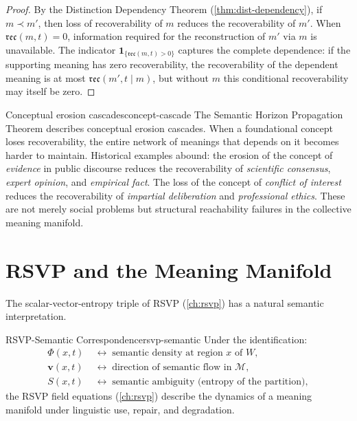 \documentclass[12pt,twoside,openright]{book}
\newcommand{\reco}{\mathfrak{rec}}
\begin{document}
\begin{proof}
  By the Distinction Dependency Theorem
  (\cref{thm:dist-dependency}), if $m \prec m'$,
  then loss of recoverability of $m$ reduces the
  recoverability of $m'$.
  When $\reco(m, t) = 0$, information required for
  the reconstruction of $m'$ via $m$ is unavailable.
  The indicator $\mathbf{1}_{\{\reco(m,t)>0\}}$
  captures the complete dependence: if the supporting
  meaning has zero recoverability, the recoverability
  of the dependent meaning is at most
  $\reco(m', t \mid m)$, but without $m$ this
  conditional recoverability may itself be zero.
\end{proof}

\begin{remark}{Conceptual erosion cascades}{concept-cascade}
  The Semantic Horizon Propagation Theorem describes
  conceptual erosion cascades.
  When a foundational concept loses recoverability,
  the entire network of meanings that depends on it
  becomes harder to maintain.
  Historical examples abound:
  the erosion of the concept of \emph{evidence}
  in public discourse reduces the recoverability of
  \emph{scientific consensus}, \emph{expert opinion},
  and \emph{empirical fact}.
  The loss of the concept of \emph{conflict of interest}
  reduces the recoverability of \emph{impartial
  deliberation} and \emph{professional ethics}.
  These are not merely social problems but structural
  reachability failures in the collective meaning manifold.
\end{remark}

\section{RSVP and the Meaning Manifold}

The scalar-vector-entropy triple of RSVP
(\cref{ch:rsvp}) has a natural semantic interpretation.

\begin{proposition}{RSVP-Semantic Correspondence}{rsvp-semantic}
  Under the identification:
  \begin{align*}
    \Phi(x,t) &\;\leftrightarrow\;
    \text{semantic density at region }x\text{ of }W, \\
    \mathbf{v}(x,t) &\;\leftrightarrow\;
    \text{direction of semantic flow in }\mathcal{M}, \\
    S(x,t) &\;\leftrightarrow\;
    \text{semantic ambiguity (entropy of the partition)},
  \end{align*}
  the RSVP field equations (\cref{ch:rsvp}) describe
  the dynamics of a meaning manifold under linguistic
  use, repair, and degradation.
\end{proposition}
\end{document}
